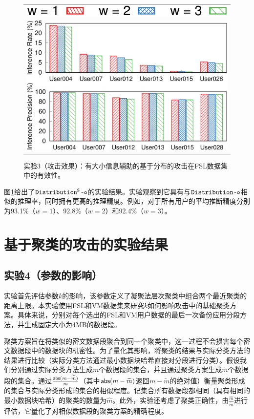 \begin{figure}[!htbp]
    \centering
    \centering
    \begin{tabular}{c}
        \includegraphics[width=.35\textwidth]{pic/legend-effectiveness.pdf}\\
        \includegraphics[width=.7\textwidth]{pic/distribution-effectiveness-w-size.pdf}
    \end{tabular}
	\caption{实验3（攻击效果）：有大小信息辅助的基于分布的攻击在FSL数据集中的有效性。}
	\label{fig:experiment-distribution-effectiveness-w}
\end{figure}

图\ref{fig:experiment-distribution-effectiveness-w}给出了$\tt Distribution^S$-$\tt o$的实验结果。实验观察到它具有与$\tt Distribution$-$\tt o$相似的推理率，同时拥有更高的推理精度。例如，对于所有用户的平均推断精度分别为93.1\%（$w = 1$）、92.8\%（$w = 2$）和92.4\%（$w = 3$）。         

\section{基于聚类的攻击的实验结果}
\label{sec:experiment-clustering}

\subsection{实验4（参数的影响）} 

实验首先评估参数$k$的影响，该参数定义了凝聚法层次聚类中组合两个最近聚类的距离上限。本实验使用FSL和VM数据集来研究$k$如何影响攻击中的基础聚类方案。具体来说，分别对每个选出的FSL和VM用户数据的最后一次备份应用分段方法，并生成固定大小为4MB的数据段。

聚类方案旨在将类似的密文数据段聚合到同一个聚类中，这一过程不会损害每个密文数据段中的数据块的机密性。为了量化其影响，将聚类的结果与实际分类方法的结果进行比较（实际分类方法通过最小数据块哈希直接对分段进行分类）。假设我们分别通过实际分类方法生成$m$个数据段的集合，并且通过聚类方案生成$\widetilde{m}$个数据段的集合。通过$\frac{{\sf abs}(m-\widetilde{m})}{m}$（其中${\sf abs}(m-\widetilde{m})$返回$m-\widetilde{m}$的绝对值）衡量聚类形成的集合与实际分类形成的集合的相似程度。记集合所有数据段都相同（具有相同的最小数据块哈希）的聚类的数量为$\hat{m}$。此外，实验还考虑了聚类正确性，由$\frac{\hat{m}}{\widetilde{m}}$进行评估，它量化了对相似数据段的聚类方案的精确程度。


